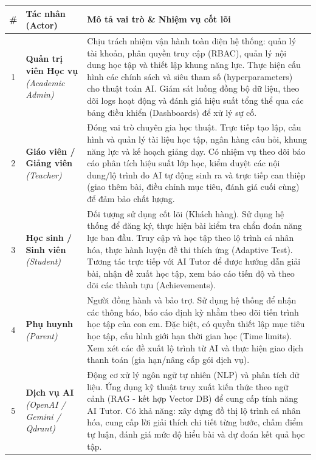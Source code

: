 \documentclass[a4paper,12pt]{article}
\begin{document}
	\renewcommand{\arraystretch}{1.15}
	\begin{longtable}{|c|p{3.8cm}|p{9.5cm}|}
		\hline
		\rowcolor{tableheader}
		\textbf{\#} & \textbf{Tác nhân (Actor)} & \textbf{Mô tả vai trò \& Nhiệm vụ cốt lõi} \\ \hline
		\endfirsthead %
		
		1 & \textbf{Quản trị viên Học vụ} \newline \textit{(Academic Admin)} & Chịu trách nhiệm vận hành toàn diện hệ thống: quản lý tài khoản, phân quyền truy cập (RBAC), quản lý nội dung học tập và thiết lập khung năng lực. Thực hiện cấu hình các chính sách và siêu tham số (hyperparameters) cho thuật toán AI. Giám sát luồng đồng bộ dữ liệu, theo dõi logs hoạt động và đánh giá hiệu suất tổng thể qua các bảng điều khiển (Dashboards) để xử lý sự cố. \\ \hline
		2 & \textbf{Giáo viên / Giảng viên} \newline \textit{(Teacher)} & Đóng vai trò chuyên gia học thuật. Trực tiếp tạo lập, cấu hình và quản lý tài liệu học tập, ngân hàng câu hỏi, khung năng lực và kế hoạch giảng dạy. Có nhiệm vụ theo dõi báo cáo phân tích hiệu suất lớp học, kiểm duyệt các nội dung/lộ trình do AI tự động sinh ra và trực tiếp can thiệp (giao thêm bài, điều chỉnh mục tiêu, đánh giá cuối cùng) để đảm bảo chất lượng. \\ \hline
		3 & \textbf{Học sinh / Sinh viên} \newline \textit{(Student)} & Đối tượng sử dụng cốt lõi (Khách hàng). Sử dụng hệ thống để đăng ký, thực hiện bài kiểm tra chẩn đoán năng lực ban đầu. Truy cập và học tập theo lộ trình cá nhân hóa, thực hành luyện đề thi thích ứng (Adaptive Test). Tương tác trực tiếp với AI Tutor để được hướng dẫn giải bài, nhận đề xuất học tập, xem báo cáo tiến độ và theo dõi các thành tựu (Achievements). \\ \hline
		4 & \textbf{Phụ huynh} \newline \textit{(Parent)} & Người đồng hành và bảo trợ. Sử dụng hệ thống để nhận các thông báo, báo cáo định kỳ nhằm theo dõi tiến trình học tập của con em. Đặc biệt, có quyền thiết lập mục tiêu học tập, cấu hình giới hạn thời gian học (Time limits). Xem xét các đề xuất lộ trình từ AI và thực hiện giao dịch thanh toán (gia hạn/nâng cấp gói dịch vụ). \\ \hline
		5 & \textbf{Dịch vụ AI} \newline \textit{(OpenAI / Gemini / Qdrant)} & Động cơ xử lý ngôn ngữ tự nhiên (NLP) và phân tích dữ liệu. Ứng dụng kỹ thuật truy xuất kiến thức theo ngữ cảnh (RAG - kết hợp Vector DB) để cung cấp tính năng AI Tutor. Có khả năng: xây dựng đồ thị lộ trình cá nhân hóa, cung cấp lời giải thích chi tiết từng bước, chấm điểm tự luận, đánh giá mức độ hiểu bài và dự đoán kết quả học tập. \\ \hline

\end{longtable}
\end{document}
